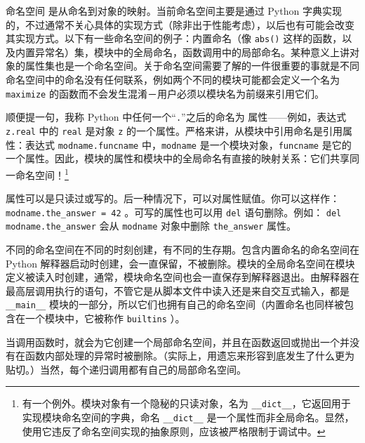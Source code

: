 命名空间 是从命名到对象的映射。当前命名空间主要是通过 Python 字典实现的，不过通常不关心具体的实现方式（除非出于性能考虑），以后也有可能会改变其实现方式。以下有一些命名空间的例子：内置命名（像 \verb|abs()| 这样的函数，以及内置异常名）集，模块中的全局命名，函数调用中的局部命名。某种意义上讲对象的属性集也是一个命名空间。关于命名空间需要了解的一件很重要的事就是不同命名空间中的命名没有任何联系，例如两个不同的模块可能都会定义一个名为 \texttt{maximize} 的函数而不会发生混淆－用户必须以模块名为前缀来引用它们。

顺便提一句，我称 Python 中任何一个“\verb|.|”之后的命名为 属性——例如，表达式 \texttt{z.real} 中的 \texttt{real} 是对象 \texttt{z} 的一个属性。严格来讲，从模块中引用命名是引用属性：表达式 \texttt{modname.funcname} 中，\texttt{modname} 是一个模块对象，\texttt{funcname} 是它的一个属性。因此，模块的属性和模块中的全局命名有直接的映射关系：它们共享同一命名空间！\cprotect\footnote{有一个例外。模块对象有一个隐秘的只读对象，名为 \verb|__dict__|，它返回用于实现模块命名空间的字典，命名 \verb|__dict__| 是一个属性而非全局命名。显然，使用它违反了命名空间实现的抽象原则，应该被严格限制于调试中。}

属性可以是只读过或写的。后一种情况下，可以对属性赋值。你可以这样作： \texttt{modname.the\_answer = 42} 。可写的属性也可以用 \texttt{del} 语句删除。例如： \texttt{del modname.the\_answer} 会从 \texttt{modname} 对象中删除 \texttt{the\_answer} 属性。

不同的命名空间在不同的时刻创建，有不同的生存期。包含内置命名的命名空间在 Python 解释器启动时创建，会一直保留，不被删除。模块的全局命名空间在模块定义被读入时创建，通常，模块命名空间也会一直保存到解释器退出。由解释器在最高层调用执行的语句，不管它是从脚本文件中读入还是来自交互式输入，都是 \verb|__main__| 模块的一部分，所以它们也拥有自己的命名空间（内置命名也同样被包含在一个模块中，它被称作 \texttt{builtins} ）。

当调用函数时，就会为它创建一个局部命名空间，并且在函数返回或抛出一个并没有在函数内部处理的异常时被删除。（实际上，用遗忘来形容到底发生了什么更为贴切。）当然，每个递归调用都有自己的局部命名空间。

